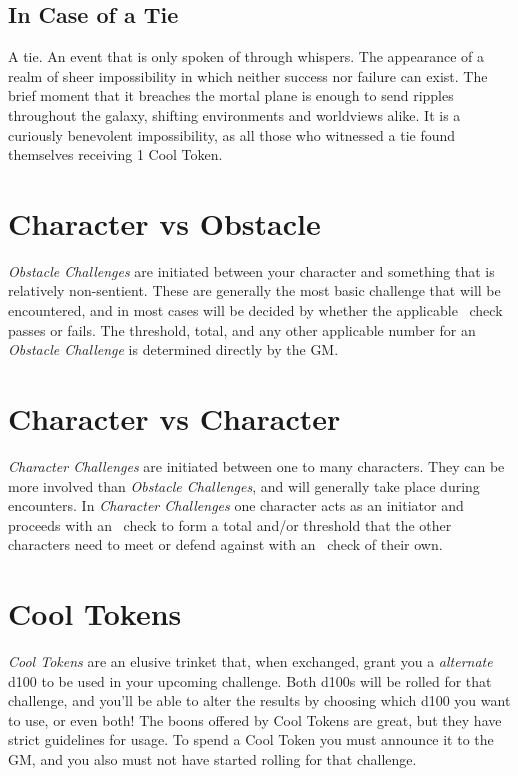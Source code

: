 \subsection{In Case of a Tie}\label{subsec:tie}
A tie. An event that is only spoken of through whispers. The appearance of a realm of sheer impossibility in which neither success nor failure can exist. The brief moment that it breaches the mortal plane is enough to send ripples throughout the galaxy, shifting environments and worldviews alike. It is a curiously benevolent impossibility, as all those who witnessed a tie found themselves receiving 1 Cool Token.

\section{Character vs Obstacle}\label{sec:vs_obstacle}
\emph{Obstacle Challenges} are initiated between your character and something that is relatively non-sentient. These are generally the most basic challenge that will be encountered, and in most cases will be decided by whether the applicable \attribute\ check passes or fails. The threshold, total, and any other applicable number for an \emph{Obstacle Challenge} is determined directly by the GM.

\section{Character vs Character}\label{sec:vs_character}
\emph{Character Challenges} are initiated between one to many characters. They can be more involved than \emph{Obstacle Challenges}, and will generally take place during encounters. In \emph{Character Challenges} one character acts as an initiator and proceeds with an \attribute\ check to form a total and/or threshold that the other characters need to meet or defend against with an \attribute\ check of their own. 

\section{Cool Tokens}\label{sec:cool_tokens}
\emph{Cool Tokens} are an elusive trinket that, when exchanged, grant you a \emph{alternate} d100 to be used in your upcoming challenge. Both d100s will be rolled for that challenge, and you'll be able to alter the results by choosing which d100 you want to use, or even both! The boons offered by Cool Tokens are great, but they have strict guidelines for usage. To spend a Cool Token you must announce it to the GM, and you also must not have started rolling for that challenge.


